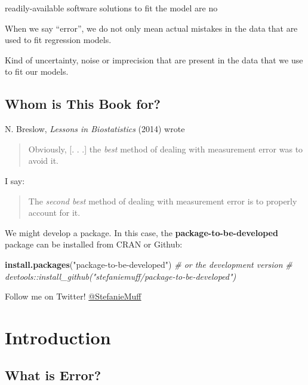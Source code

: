 \documentclass[]{book}
\newenvironment{Shaded}{\begin{snugshade}}{\end{snugshade}}
\newcommand{\KeywordTok}[1]{\textcolor[rgb]{0.13,0.29,0.53}{\textbf{#1}}}
\newcommand{\StringTok}[1]{\textcolor[rgb]{0.31,0.60,0.02}{#1}}
\newcommand{\CommentTok}[1]{\textcolor[rgb]{0.56,0.35,0.01}{\textit{#1}}}
\newcommand{\NormalTok}[1]{#1}
\theoremstyle{definition}
\theoremstyle{definition}
\theoremstyle{definition}
\theoremstyle{remark}
\begin{document}
readily-available software solutions to fit the model are no

When we say ``error'', we do not only mean actual mistakes in the data
that are used to fit regression models.

Kind of uncertainty, noise or imprecision that are present in the data
that we use to fit our models.

\section*{Whom is This Book for?}\label{whom-is-this-book-for}

N. Breslow, \emph{Lessons in Biostatistics} (2014) \citep{breslow2014}
wrote

\begin{quote}
Obviously, {[}. . .{]} the \emph{best} method of dealing with
measurement error was to avoid it.
\end{quote}

I say:

\begin{quote}
The \emph{second best} method of dealing with measurement error is to
properly account for it.
\end{quote}

We might develop a package. In this case, the
\textbf{package-to-be-developed} package can be installed from CRAN or
Github:

\begin{Shaded}
\begin{Highlighting}[]
\KeywordTok{install.packages}\NormalTok{(}\StringTok{"package-to-be-developed"}\NormalTok{)}
\CommentTok{# or the development version}
\CommentTok{# devtools::install_github("stefaniemuff/package-to-be-developed")}
\end{Highlighting}
\end{Shaded}

Follow me on Twitter!
\href{https://twitter.com/stefaniemuff}{@StefanieMuff}

\chapter{Introduction}\label{intro}

\section{What is Error?}\label{what-is-error}
\end{document}
